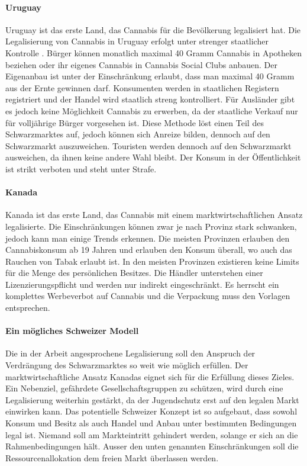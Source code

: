 \documentclass[../main.tex]{subfiles}
\begin{document}
	 \paragraph{Uruguay}
	 Uruguay ist das erste Land, das Cannabis für die Bevölkerung legalisiert hat.
	 Die Legalisierung von Cannabis in Uruguay erfolgt unter strenger staatlicher Kontrolle \cite{fijnaut}. 
	 Bürger können monatlich maximal 40 Gramm Cannabis in Apotheken beziehen oder ihr eigenes Cannabis in Cannabis Social Clubs anbauen.
	 Der Eigenanbau ist unter der Einschränkung erlaubt, dass man maximal 40 Gramm aus der Ernte gewinnen darf.
	 Konsumenten werden in staatlichen Registern registriert und der Handel wird staatlich streng kontrolliert.
	 Für Ausländer gibt es jedoch keine Möglichkeit Cannabis zu erwerben, da der staatliche Verkauf nur für volljährige Bürger vorgesehen ist.
	 Diese Methode löst einen Teil des Schwarzmarktes auf, jedoch können sich Anreize bilden, dennoch auf den Schwarzmarkt auszuweichen. 
	 Touristen werden dennoch auf den Schwarzmarkt ausweichen, da ihnen keine andere Wahl bleibt.
	 Der Konsum in der Öffentlichkeit ist strikt verboten und steht unter Strafe.
	 	 
	 
	 \paragraph{Kanada}
	 Kanada ist das erste Land, das Cannabis mit einem marktwirtschaftlichen Ansatz legalisierte.
	 Die Einschränkungen können zwar je nach Provinz stark schwanken, jedoch kann man einige Trends erkennen.
	 Die meisten Provinzen erlauben den Cannabiskonsum ab 19 Jahren und erlauben den Konsum überall, wo auch das Rauchen von Tabak erlaubt ist.
	 In den meisten Provinzen existieren keine Limits für die Menge des persönlichen Besitzes.
	 Die Händler unterstehen einer Lizenzierungspflicht und werden nur indirekt eingeschränkt. 
	 Es herrscht ein komplettes Werbeverbot auf Cannabis und die Verpackung muss den Vorlagen entsprechen.
	 
	 
	 \paragraph{Ein mögliches Schweizer Modell}
	 Die in der Arbeit angesprochene Legalisierung soll den Anspruch der Verdrängung des Schwarzmarktes so weit wie möglich erfüllen.
	 Der marktwirtschaftliche Ansatz Kanadas eignet sich für die Erfüllung dieses Zieles.
	 Ein Nebenziel, gefährdete Gesellschaftsgruppen zu schützen, wird durch eine Legalisierung weiterhin gestärkt, da der Jugendschutz erst auf den legalen Markt einwirken kann.
	 Das potentielle Schweizer Konzept ist so aufgebaut, dass sowohl Konsum und Besitz als auch Handel und Anbau unter bestimmten Bedingungen legal ist.
	 Niemand soll am Markteintritt gehindert werden, solange er sich an die Rahmenbedingungen hält.
	 Ausser den unten genannten Einschränkungen soll die Ressourcenallokation dem freien Markt überlassen werden. 	 
	 
\end{document}
